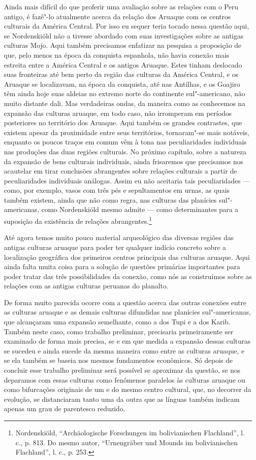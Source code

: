 Ainda mais difícil do que proferir uma avaliação sobre as relações com o
Peru antigo, é fazê"-lo atualmente acerca da relação dos Aruaque com os
centros culturais da América Central. Por isso eu sequer teria tocado
nessa questão aqui, se Nordenskiöld não a tivesse abordado com suas
investigações sobre as antigas culturas Mojo. Aqui também precisamos
enfatizar na pesquisa a proposição de que, pelo menos na época da
conquista espanhola, não havia conexão mais estreita entre a América
Central e os antigos Aruaque. Estes tinham deslocado suas fronteiras até
bem perto da região das culturas da América Central, e os Aruaque se
localizavam, na época da conquista, até nas Antilhas, e os Goajiro têm
ainda hoje suas aldeias no extremo norte do continente sul"-americano,
não muito distante dali. Mas verdadeiras ondas, da maneira como as
conhecemos na expansão das culturas aruaque, em todo caso, não
irromperam em períodos posteriores no território dos Aruaque. Aqui
também os grandes contrastes, que existem apesar da proximidade entre
seus territórios, tornaram"-se mais notáveis, enquanto os poucos traços
em comum vêm à tona nas peculiaridades individuais nas produções das
duas regiões culturais. No próximo capítulo, sobre a natureza da
expansão de bens culturais individuais, ainda frisaremos que precisamos
nos acautelar em tirar conclusões abrangentes sobre relações culturais a
partir de peculiaridades individuais análogas. Assim eu não aceitaria
tais peculiaridades --- como, por exemplo, vasos com três pés e
sepultamentos em urnas, as quais também existem, ainda que não como
regra, nas culturas das planícies sul"-americanas, como Nordenskiöld
mesmo admite --- como determinantes para a suposição da existência de
relações abrangentes.\footnote{Nordenskiöld, ``Archäologische Forschungen
  im bolivianischen Flachland'', l. c., p. 813. Do mesmo autor,
  ``Urnengräber und Mounds im bolivianischen Flachland'', l. c., p.
  253.}

Até agora temos muito pouco material arqueológico das diversas regiões
das antigas culturas aruaque para poder ter qualquer indício concreto
sobre a localização geográfica dos primeiros centros principais das
culturas aruaque. Aqui ainda falta muita coisa para a solução de
questões primárias importantes para poder tratar das três
possibilidades da conexão, como nós as construímos sobre as relações com
as antigas culturas peruanas do planalto.

De forma muito parecida ocorre com a questão acerca das outras conexões
entre as culturas aruaque e as demais culturas difundidas nas planícies
sul"-americanas, que alcançaram uma expansão semelhante, como a dos Tupi
e a dos Karib. Também neste caso, como trabalho preliminar, precisaria
primeiramente ser examinado de forma mais precisa, se e em que medida a
expansão dessas culturas se sucedeu e ainda sucede da mesma maneira
como entre as culturas aruaque, e se ela também se baseia nos mesmos
fundamentos econômicos. Só depois de concluir esse trabalho preliminar
será possível se aproximar da questão, se nos deparamos com essas
culturas como fenômenos paralelos às culturas aruaque ou como
bifurcações originais de um e do mesmo centro cultural, que, no decorrer
da evolução, se distanciaram tanto uma da outra que as línguas também
indicam apenas um grau de parentesco reduzido.

